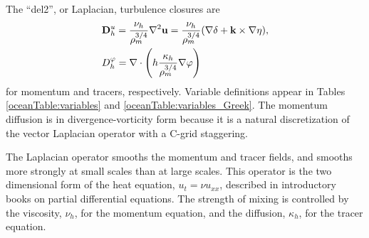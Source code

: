 The ``del2'', or Laplacian, turbulence closures are
\begin{eqnarray}
\label{ocean:\mode_h_mom_del2}
& {\bf D}^u_h=\displaystyle\frac{\nu_h}{\rho_m^{3/4}} \nabla^2 {\bf u} 
= \displaystyle\frac{\nu_h}{\rho_m^{3/4}}(\nabla \delta + {\bf 
k}\times \nabla \eta),\\
\label{ocean:\mode_h_tr_del2}
& D^\varphi_h = \nabla\cdot\left(h 
   \displaystyle\frac{\kappa_h}{\rho_m^{3/4}} \nabla\varphi \right)
\end{eqnarray}
for momentum and tracers, respectively.  Variable definitions appear in Tables \ref{oceanTable:variables} and \ref{oceanTable:variables_Greek}.  The momentum diffusion is in divergence-vorticity form because it is a natural discretization of the vector Laplacian operator with a C-grid staggering.  

The Laplacian operator smooths the momentum and 
tracer fields, and smooths more strongly at small scales than at large 
scales.  This operator is the two dimensional form of the heat equation, 
$u_t=\nu u_{xx}$, described in introductory books on partial 
differential equations.  The strength of mixing is controlled by the 
viscosity, $\nu_h$, for the momentum equation, and the diffusion, 
$\kappa_h$, for the tracer equation.
